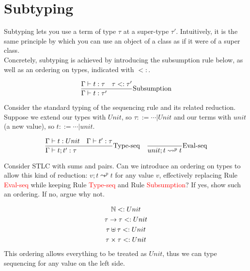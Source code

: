 \documentclass{article}
\begin{document}
\newpage
\section{Subtyping}
Subtyping lets you use a term of type $\tau$ at a super-type $\tau'$. Intuitively, it is the same principle by which you can use an object of a class as if it were of a super class. \\
Concretely, subtyping is achieved by introducing the subsumption rule below, as well as an ordering on types, indicated with $<:$.

\begin{gather*}
    \st[Subsumption]{
        \Gamma\vdash t:\tau'
    }{
        \Gamma\vdash t:\tau \quad
        \tau <:\tau'
    }
\end{gather*}

Consider the standard typing of the sequencing rule and its related reduction. Suppose we extend our types with $Unit$, so $\tau ::= \cdots | Unit$ and our terms with $unit$ (a new value), so $t ::= \cdots | unit$.

$$
\begin{array}{lr}
    \st[Type-seq]{
        \Gamma\vdash t;t':\tau
    }{
        \Gamma \vdash t: Unit \quad
        \Gamma \vdash t':\tau
    }
    &
    \st[Eval-seq]{
        unit;t\leadsto^p t
    }{}
\end{array}
$$

Consider STLC with sums and pairs. Can we introduce an ordering on types to allow this kind of reduction: $v;t \leadsto^p t$ for any value $v$, effectively replacing Rule \textcolor{red}{Eval-seq} while keeping Rule \textcolor{red}{Type-seq} and Rule \textcolor{red}{Subsumption}? If yes, show such an ordering. If no, argue why not.

\hline
\begin{gather*}
    \mathbb N <: Unit \\
    \tau\to\tau <: Unit \\
    \tau\uplus\tau <: Unit \\
    \tau\times\tau <: Unit \\
\end{gather*}
This ordering allows everything to be treated as $Unit$, thus we can type sequencing for any value on the left side.
\end{document}
